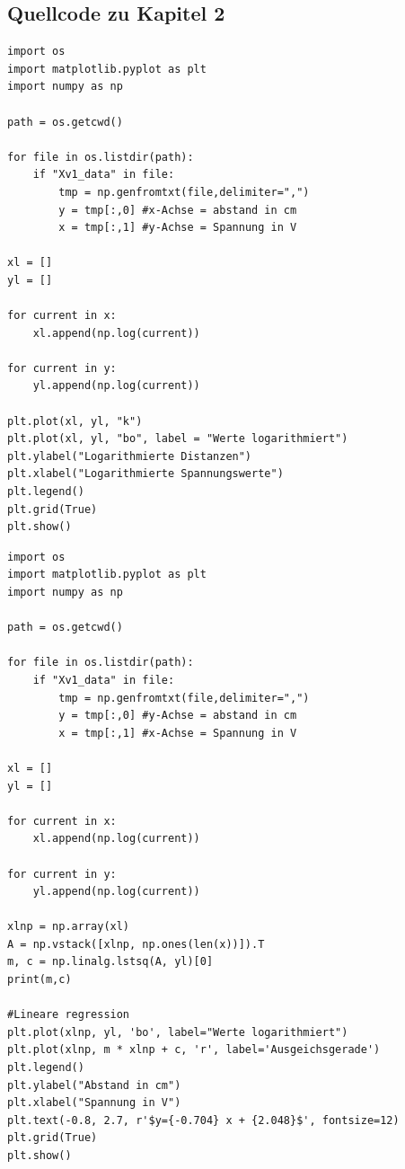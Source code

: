 \documentclass[12pt,oneside,a4paper]{report}
\begin{document}
\subsection{Quellcode zu Kapitel 2}
\label{chap:APPENDIX_SOURCECODE_V2}
\begin{lstlisting}[style=PYTHON,frame=single,
 caption=Messergebnisse Logarithmieren,
 captionpos=b,
 label=lst:LOGARITHMIEREN]
import os
import matplotlib.pyplot as plt
import numpy as np

path = os.getcwd()

for file in os.listdir(path):
    if "Xv1_data" in file:
        tmp = np.genfromtxt(file,delimiter=",") 
        y = tmp[:,0] #x-Achse = abstand in cm
        x = tmp[:,1] #y-Achse = Spannung in V

xl = []
yl = []

for current in x:
    xl.append(np.log(current))

for current in y:
    yl.append(np.log(current))
    
plt.plot(xl, yl, "k")
plt.plot(xl, yl, "bo", label = "Werte logarithmiert") 
plt.ylabel("Logarithmierte Distanzen")
plt.xlabel("Logarithmierte Spannungswerte")
plt.legend()
plt.grid(True)
plt.show()
\end{lstlisting}
\newpage
\begin{lstlisting}[style=PYTHON,frame=single,
 caption=Lineare Regression,
 captionpos=b,
 label=lst:LINREG]
import os
import matplotlib.pyplot as plt
import numpy as np

path = os.getcwd()

for file in os.listdir(path):
    if "Xv1_data" in file:
        tmp = np.genfromtxt(file,delimiter=",") 
        y = tmp[:,0] #y-Achse = abstand in cm
        x = tmp[:,1] #x-Achse = Spannung in V

xl = []
yl = []

for current in x:
    xl.append(np.log(current))

for current in y:
    yl.append(np.log(current))

xlnp = np.array(xl)
A = np.vstack([xlnp, np.ones(len(x))]).T
m, c = np.linalg.lstsq(A, yl)[0]
print(m,c)

#Lineare regression
plt.plot(xlnp, yl, 'bo', label="Werte logarithmiert")
plt.plot(xlnp, m * xlnp + c, 'r', label='Ausgeichsgerade')
plt.legend()
plt.ylabel("Abstand in cm")
plt.xlabel("Spannung in V")
plt.text(-0.8, 2.7, r'$y={-0.704} x + {2.048}$', fontsize=12)
plt.grid(True)
plt.show()
\end{lstlisting}
\newpage
\end{document}
